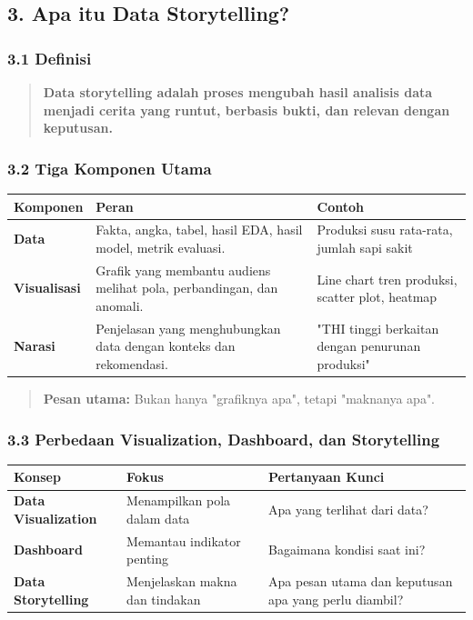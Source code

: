 \documentclass[12pt,a4paper]{article}
\begin{document}
\subsection{3. Apa itu Data Storytelling?}

\subsubsection{3.1 Definisi}

\begin{quote}
\textbf{Data storytelling adalah proses mengubah hasil analisis data menjadi cerita yang runtut, berbasis bukti, dan relevan dengan keputusan.}\end{quote}


\subsubsection{3.2 Tiga Komponen Utama}

\begin{tabular}{|l|l|l|}
\hline
Komponen & Peran & Contoh \\
\hline
\textbf{Data} & Fakta, angka, tabel, hasil EDA, hasil model, metrik evaluasi. & Produksi susu rata-rata, jumlah sapi sakit \\
\hline
\textbf{Visualisasi} & Grafik yang membantu audiens melihat pola, perbandingan, dan anomali. & Line chart tren produksi, scatter plot, heatmap \\
\hline
\textbf{Narasi} & Penjelasan yang menghubungkan data dengan konteks dan rekomendasi. & "THI tinggi berkaitan dengan penurunan produksi" \\
\hline
\end{tabular}


\begin{quote}
\textbf{Pesan utama:} Bukan hanya "grafiknya apa", tetapi "maknanya apa".\end{quote}


\subsubsection{3.3 Perbedaan Visualization, Dashboard, dan Storytelling}

\begin{tabular}{|l|l|l|}
\hline
Konsep & Fokus & Pertanyaan Kunci \\
\hline
\textbf{Data Visualization} & Menampilkan pola dalam data & Apa yang terlihat dari data? \\
\hline
\textbf{Dashboard} & Memantau indikator penting & Bagaimana kondisi saat ini? \\
\hline
\textbf{Data Storytelling} & Menjelaskan makna dan tindakan & Apa pesan utama dan keputusan apa yang perlu diambil? \\
\hline
\end{tabular}
\end{document}
